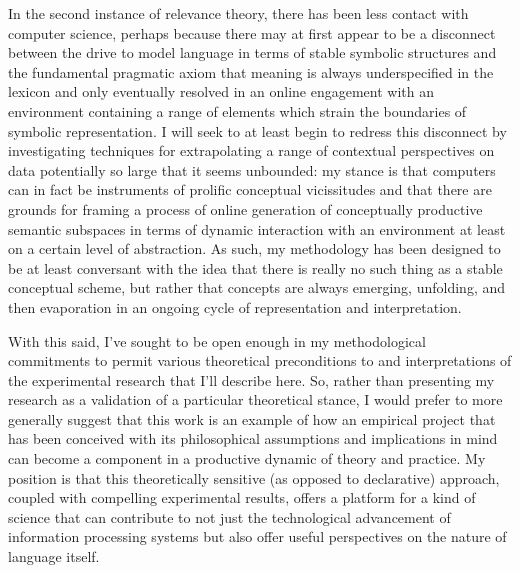 In the second instance of relevance theory, there has been less contact with computer science, perhaps because there may at first appear to be a disconnect between the drive to model language in terms of stable symbolic structures and the fundamental pragmatic axiom that meaning is always underspecified in the lexicon and only eventually resolved in an online engagement with an environment containing a range of elements which strain the boundaries of symbolic representation.  I will seek to at least begin to redress this disconnect by investigating techniques for extrapolating a range of contextual perspectives on data potentially so large that it seems unbounded: my stance is that computers can in fact be instruments of prolific conceptual vicissitudes and that there are grounds for framing a process of online generation of conceptually productive semantic subspaces in terms of dynamic interaction with an environment at least on a certain level of abstraction.  As such, my methodology has been designed to be at least conversant with the idea that there is really no such thing as a stable conceptual scheme, but rather that concepts are always emerging, unfolding, and then evaporation in an ongoing cycle of representation and interpretation.

With this said, I've sought to be open enough in my methodological commitments to permit various theoretical preconditions to and interpretations of the experimental research that I'll describe here.  So, rather than presenting my research as a validation of a particular theoretical stance, I would prefer to more generally suggest that this work is an example of how an empirical project that has been conceived with its philosophical assumptions and implications in mind can become a component in a productive dynamic of theory and practice.  My position is that this theoretically sensitive (as opposed to declarative) approach, coupled with compelling experimental results, offers a platform for a kind of science that can contribute to not just the technological advancement of information processing systems but also offer useful perspectives on the nature of language itself.

